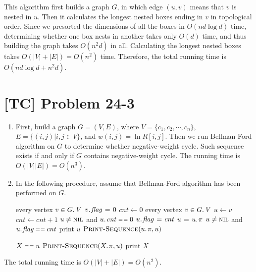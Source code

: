 \documentclass[a4paper,11pt,twocolumn]{article}
\newcommand{\NIL}{\const{nil}}
\newcommand{\FALSE}{\const{false}}
\newcommand{\TRUE}{\const{true}}
\begin{document}
\begin{enumerate}
  This algorithm first builds a graph $G$, in which edge $(u, v)$ means that $v$ is nested in $u$. Then it calculates the longest nested boxes ending in $v$ in topological order. Since we presorted the dimensions of all the boxes in $O(nd \log d)$ time, determining whether one box nests in another takes only $O(d)$ time, and thus building the graph takes $O(n^2d)$ in all. Calculating the longest nested boxes takes $O(|V|+|E|) = O(n^2)$ time. Therefore, the total running time is $O(nd \log d + n^2d)$.
  \end{enumerate}

  \section{[TC] Problem 24-3}
  \begin{enumerate}
  \item First, build a graph $G=(V, E)$, where $V = \{c_1, c_2, \cdots, c_n\}$, $E = \{(i, j)| i, j \in V\}$, and $w(i, j) = \ln R[i,j]$. Then we run Bellman-Ford algorithm on $G$ to determine whether negative-weight cycle. Such sequence exists if and only if $G$ contains negative-weight cycle. The running time is $O(|V||E|) = O(n^3)$.
  \item In the following procedure, assume that Bellman-Ford algorithm has been performed on $G$.
  \begin{codebox}
  \li \For every vertex $v \in \attrib{G}{V}$
  \li \Do  $\attrib{v}{flag} \gets 0$
      \End
  \li $cnt \gets 0$
  \li \For every vertex $v \in \attrib{G}{V}$
  \li \Do $u \gets v$
  \li     $cnt \gets cnt + 1$
  \li     \While $u \neq \NIL$ and $\attrib{u}{cnt} \isequal 0$
  \li     \Do $\attrib{u}{flag} \gets cnt$
  \li         $u \gets \attrib{u}{\pi}$
  \li         \If $u \neq \NIL$ and $\attrib{u}{flag} \isequal cnt$
  \li         \Do print $u$
  \li             $\proc{Print-Sequence}(\attrib{u}{\pi}, u)$
  \li         \Return \TRUE
              \End
          \End
      \End
  \li \Return \FALSE
  \end{codebox}
  \begin{codebox}
  \li \If $X \isequal u$
  \li \Do \Return
      \End
  \li $\proc{Print-Sequence}(\attrib{X}{\pi}, u)$
  \li print $X$
  \end{codebox}
  \end{enumerate}
  
  The total running time is $O(|V|+|E|) = O(n^2)$.
\end{document}
